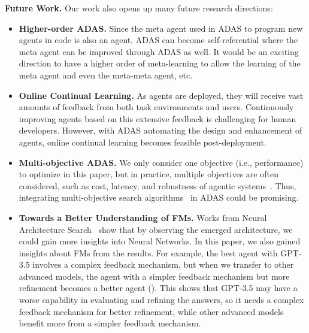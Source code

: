 \documentclass{article}
\newcommand{\problem}{ADAS\xspace}
\begin{document}
\noindent\textbf{Future Work.}\hspace{0.5em} Our work also opens up many future research directions:
\begin{itemize}[label=\large\textbullet, left=0pt]

\item \noindent\textbf{Higher-order \problem.}\hspace{0.2em} Since the meta agent used in \problem to program new agents in code is also an agent, \problem can become self-referential where the meta agent can be improved through \problem as well. It would be an exciting direction to have a higher order of meta-learning to allow the learning of the meta agent and even the meta-meta agent, etc.~\citep{lu2023arbitrary,schmidhuber:1987:srl,schmidhuber2003godel,zelikman2024self}

\item \noindent\textbf{Online Continual Learning.}\hspace{0.3em} As agents are deployed, they will receive vast amounts of feedback from both task environments and users. Continuously improving agents based on this extensive feedback is challenging for human developers. However, with ADAS automating the design and enhancement of agents, online continual learning becomes feasible post-deployment.

\item \noindent\textbf{Multi-objective \problem.}\hspace{0.3em} We only consider one objective (i.e., performance) to optimize in this paper, but in practice, multiple objectives are often considered, such as cost, latency, and robustness of agentic systems~\citep{hu2021accelerating,huang2023revisiting}. Thus, integrating multi-objective search algorithms~\citep{deb2002fast} in \problem could be promising.

\item \noindent\textbf{Towards a Better Understanding of FMs.}\hspace{0.3em}  Works from Neural Architecture Search~\citep{huang2023revisiting} show that by observing the emerged architecture, we could gain more insights into Neural Networks. In this paper, we also gained insights about FMs from the results. For example, the best agent with GPT-3.5 involves a complex feedback mechanism, but when we transfer to other advanced models, the agent with a simpler feedback mechanism but more refinement becomes a better agent (). This shows that GPT-3.5 may have a worse capability in evaluating and refining the answers, so it needs a complex feedback mechanism for better refinement, while other advanced models benefit more from a simpler feedback mechanism.


\end{itemize}
\end{document}
